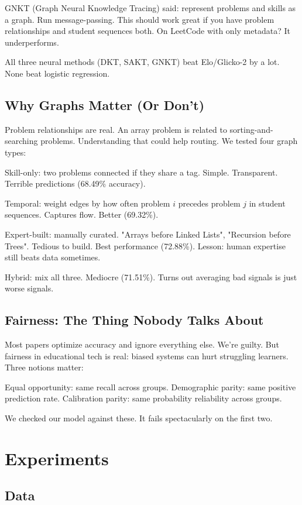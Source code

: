 \documentclass[conference]{IEEEtran}
\begin{document}
GNKT (Graph Neural Knowledge Tracing) said: represent problems and skills as a graph. Run message-passing. This should work great if you have problem relationships and student sequences both. On LeetCode with only metadata? It underperforms.

All three neural methods (DKT, SAKT, GNKT) beat Elo/Glicko-2 by a lot. None beat logistic regression.

\subsection{Why Graphs Matter (Or Don't)}

Problem relationships are real. An array problem is related to sorting-and-searching problems. Understanding that could help routing. We tested four graph types:

Skill-only: two problems connected if they share a tag. Simple. Transparent. Terrible predictions (68.49\% accuracy).

Temporal: weight edges by how often problem $i$ precedes problem $j$ in student sequences. Captures flow. Better (69.32\%).

Expert-built: manually curated. "Arrays before Linked Lists", "Recursion before Trees". Tedious to build. Best performance (72.88\%). Lesson: human expertise still beats data sometimes.

Hybrid: mix all three. Mediocre (71.51\%). Turns out averaging bad signals is just worse signals.

\subsection{Fairness: The Thing Nobody Talks About}

Most papers optimize accuracy and ignore everything else. We're guilty. But fairness in educational tech is real: biased systems can hurt struggling learners. Three notions matter:

Equal opportunity: same recall across groups.
Demographic parity: same positive prediction rate.
Calibration parity: same probability reliability across groups.

We checked our model against these. It fails spectacularly on the first two.

\section{Experiments}

\subsection{Data}
\end{document}
